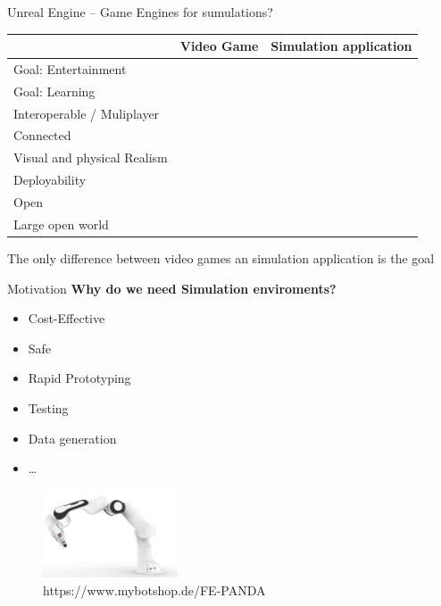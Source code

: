 \documentclass[11pt,t,usepdftitle=false,aspectratio=169]{beamer}
\newcommand{\cmark}{\color{darkgreen}\ding{51}}%
\newcommand{\xmark}{\color{red}\ding{55}}%
\begin{document}
\begin{frame}{Unreal Engine -- Game Engines for sumulations?}
   \begin{table}
      \begin{tabular}{>{\hfill}p{5cm} | c c}
         & Video Game & Simulation application \\ \hline
         Goal: Entertainment & \cmark & \xmark \\
         Goal: Learning & \xmark & \cmark \\
         Interoperable / Muliplayer & \cmark & \cmark \\
         Connected & \cmark & \cmark \\
         Visual and physical Realism & \cmark & \cmark \\
         Deployability & \cmark & \cmark \\
         Open & \cmark & \cmark \\
         Large open world & \cmark & \cmark \\
      \end{tabular}
   \end{table}
   \bigbreak
   The only difference between video games an simulation application is the goal
\end{frame}

\begin{frame}{Motivation}
   \textbf{Why do we need Simulation enviroments?}
   \begin{multicols}{2}
      \begin{itemize}
         \item Cost-Effective
         \item Safe
         \item Rapid Prototyping
         \item Testing
         \item Data generation
         \item \dots
      \end{itemize}
   \end{multicols}

   \begin{figure}
      \includegraphics[width=4cm]{images/fe-panda.jpg}
      \caption{https://www.mybotshop.de/FE-PANDA}
   \end{figure}

\end{frame}
\end{document}
